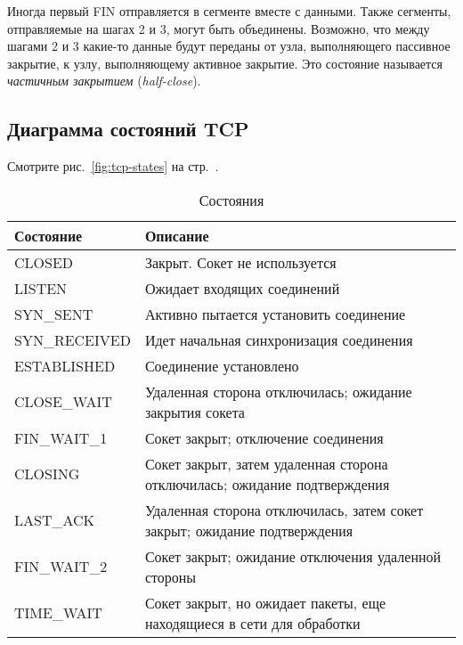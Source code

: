 Иногда первый FIN отправляется в сегменте вместе с данными. Также сегменты, отправляемые на шагах 2 и 3, могут быть объединены. Возможно, что между шагами 2 и 3 какие-то данные будут переданы от узла, выполняющего пассивное закрытие, к узлу, выполняющему активное закрытие. Это состояние называется \emph{частичным закрытием} (\emph{half-close}).

\subsection{Диаграмма состояний TCP}
Смотрите рис.~\ref{fig:tcp-states} на стр.~\pageref{fig:tcp-states}.

\begin{table}[h!]
  \caption{Состояния}
  \begin{center}
    \begin{tabular}{p{3.5cm}p{9cm}}
      \toprule
      \textbf{Состояние} & \textbf{Описание} \\
      \midrule
      CLOSED         & Закрыт. Сокет не используется \\
      LISTEN         & Ожидает входящих соединений \\
      SYN\_SENT      & Активно пытается установить соединение \\
      SYN\_RECEIVED  & Идет начальная синхронизация соединения \\
      ESTABLISHED    & Соединение установлено \\
      CLOSE\_WAIT    & Удаленная сторона отключилась; ожидание закрытия сокета \\
      FIN\_WAIT\_1   & Сокет закрыт; отключение соединения \\
      CLOSING        & Сокет закрыт, затем удаленная сторона отключилась; ожидание подтверждения \\
      LAST\_ACK      & Удаленная сторона отключилась, затем сокет закрыт; ожидание подтверждения \\
      FIN\_WAIT\_2   & Сокет закрыт; ожидание отключения удаленной стороны \\
      TIME\_WAIT     & Сокет закрыт, но ожидает пакеты, еще находящиеся в сети для обработки \\
      \bottomrule
    \end{tabular}
  \end{center}
\end{table}

